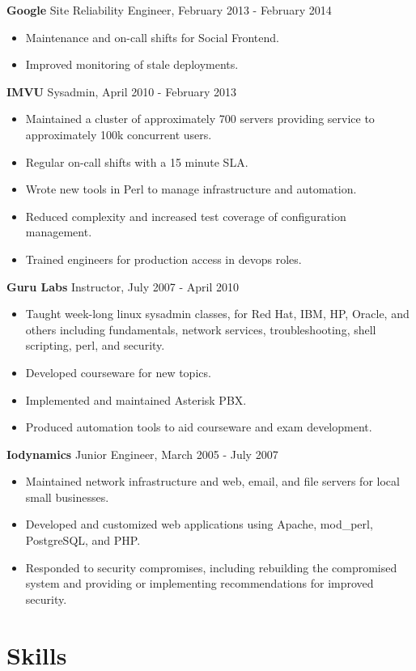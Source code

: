 \documentclass[line]{res}
\begin{document}
\begin{resume}
\textbf{Google} Site Reliability Engineer, February 2013 - February 2014
\begin{itemize}
\item Maintenance and on-call shifts for Social Frontend.
\item Improved monitoring of stale deployments.
\end{itemize}

\textbf{IMVU} Sysadmin, April 2010 - February 2013
\begin{itemize}
\item Maintained a cluster of approximately 700 servers providing service to approximately 100k concurrent users.
\item Regular on-call shifts with a 15 minute SLA.
\item Wrote new tools in Perl to manage infrastructure and automation.
\item Reduced complexity and increased test coverage of configuration management.
\item Trained engineers for production access in devops roles.
\end{itemize}

\textbf{Guru Labs} Instructor, July 2007 - April 2010
\begin{itemize}
\item Taught week-long linux sysadmin classes, for Red Hat, IBM, HP, Oracle, and others including fundamentals, network services, troubleshooting, shell scripting, perl, and security.
\item Developed courseware for new topics.
\item Implemented and maintained Asterisk PBX.
\item Produced automation tools to aid courseware and exam development.
\end{itemize}

\textbf{Iodynamics} Junior Engineer, March 2005 - July 2007
\begin{itemize}
\item Maintained network infrastructure and web, email, and file servers for local small businesses.
\item Developed and customized web applications using Apache, mod\_perl, PostgreSQL, and PHP.
\item Responded to security compromises, including rebuilding the compromised system and providing or implementing recommendations for improved security.
\end{itemize}

\section{Skills}


\end{resume}
\end{document}
